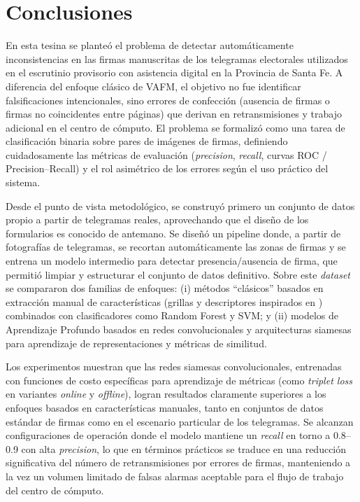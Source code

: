 \chapter{Conclusiones}

En esta tesina se planteó el problema de detectar automáticamente inconsistencias en las firmas manuscritas de los telegramas electorales utilizados en el escrutinio provisorio con asistencia digital en la Provincia de Santa Fe. A diferencia del enfoque clásico de VAFM, el objetivo no fue identificar falsificaciones intencionales, sino errores de confección (ausencia de firmas o firmas no coincidentes entre páginas) que derivan en retransmisiones y trabajo adicional en el centro de cómputo. El problema se formalizó como una tarea de clasificación binaria sobre pares de imágenes de firmas, definiendo cuidadosamente las métricas de evaluación (\textit{precision}, \textit{recall}, curvas ROC / Precision–Recall) y el rol asimétrico de los errores según el uso práctico del sistema. 

Desde el punto de vista metodológico, se construyó primero un conjunto de datos propio a partir de telegramas reales, aprovechando que el diseño de los formularios es conocido de antemano. Se diseñó un pipeline donde, a partir de fotografías de telegramas, se recortan automáticamente las zonas de firmas y se entrena un modelo intermedio para detectar presencia/ausencia de firma, que permitió limpiar y estructurar el conjunto de datos definitivo. Sobre este \textit{dataset} se compararon dos familias de enfoques: (i) métodos “clásicos” basados en extracción manual de características (grillas y descriptores inspirados en \cite{tesis-parodi}) combinados con clasificadores como Random Forest y SVM; y (ii) modelos de Aprendizaje Profundo basados en redes convolucionales y arquitecturas siamesas para aprendizaje de representaciones y métricas de similitud. 

Los experimentos muestran que las redes siamesas convolucionales, entrenadas con funciones de costo específicas para aprendizaje de métricas (como \textit{triplet loss} en variantes \textit{online} y \textit{offline}), logran resultados claramente superiores a los enfoques basados en características manuales, tanto en conjuntos de datos estándar de firmas como en el escenario particular de los telegramas. Se alcanzan configuraciones de operación donde el modelo mantiene un \textit{recall} en torno a 0.8–0.9 con alta \textit{precision}, lo que en términos prácticos se traduce en una reducción significativa del número de retransmisiones por errores de firmas, manteniendo a la vez un volumen limitado de falsas alarmas aceptable para el flujo de trabajo del centro de cómputo. 

